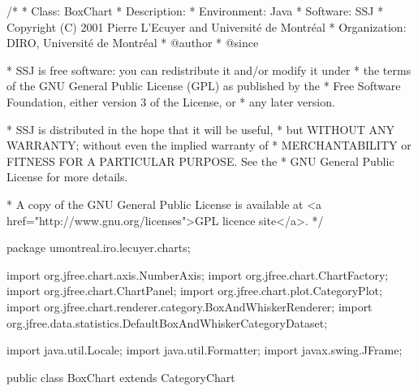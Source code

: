 \begin{code}
\begin{hide}
/*
 * Class:        BoxChart
 * Description:  
 * Environment:  Java
 * Software:     SSJ 
 * Copyright (C) 2001  Pierre L'Ecuyer and Université de Montréal
 * Organization: DIRO, Université de Montréal
 * @author       
 * @since

 * SSJ is free software: you can redistribute it and/or modify it under
 * the terms of the GNU General Public License (GPL) as published by the
 * Free Software Foundation, either version 3 of the License, or
 * any later version.

 * SSJ is distributed in the hope that it will be useful,
 * but WITHOUT ANY WARRANTY; without even the implied warranty of
 * MERCHANTABILITY or FITNESS FOR A PARTICULAR PURPOSE.  See the
 * GNU General Public License for more details.

 * A copy of the GNU General Public License is available at
   <a href="http://www.gnu.org/licenses">GPL licence site</a>.
 */
\end{hide}
package umontreal.iro.lecuyer.charts;\begin{hide}

import   org.jfree.chart.axis.NumberAxis;
import   org.jfree.chart.ChartFactory;
import   org.jfree.chart.ChartPanel;
import   org.jfree.chart.plot.CategoryPlot;
import   org.jfree.chart.renderer.category.BoxAndWhiskerRenderer;
import   org.jfree.data.statistics.DefaultBoxAndWhiskerCategoryDataset;

import   java.util.Locale;
import   java.util.Formatter;
import   javax.swing.JFrame;
\end{hide}


public class BoxChart extends CategoryChart \begin{hide} {

   protected void init (String title, String XLabel, String YLabel) {
      // create the chart...
      chart = ChartFactory.createBoxAndWhiskerChart (
         title,                         // chart title
         XLabel,                        // x axis label
         YLabel,                        // y axis label
         (DefaultBoxAndWhiskerCategoryDataset)dataset.getSeriesCollection(), // data
         true                          // include legend
      );

      ((CategoryPlot)chart.getPlot()).setRenderer(dataset.getRenderer());
      // Initialize axis variables
      initAxis();
   }

   protected void initAxis(){
      YAxis = new Axis((NumberAxis)((CategoryPlot) chart.getPlot()).getRangeAxis(),
                        Axis.ORIENTATION_VERTICAL);
      setAutoRange();
   }
\end{hide}
\end{code}


